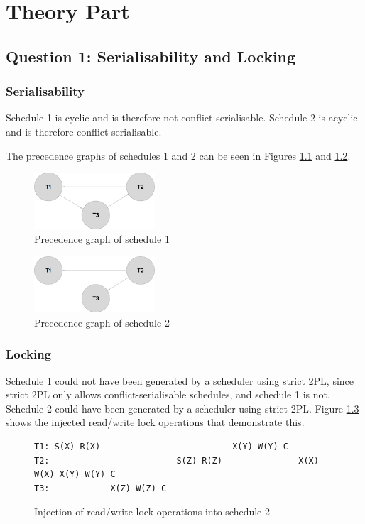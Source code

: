 \chapter{Theory Part}

\section{Question 1: Serialisability and Locking}

\subsection{Serialisability}
Schedule 1 is cyclic and is therefore not conflict-serialisable. Schedule 2 is acyclic and is therefore conflict-serialisable.

The precedence graphs of schedules 1 and 2 can be seen in Figures \ref{precedencegraph1} and \ref{precedencegraph2}.

\begin{figure}[H]
    \centering
    \includegraphics[width=0.4\textwidth]{schedule1.png}
    \caption{Precedence graph of schedule 1 \label{precedencegraph1}}
\end{figure}

\begin{figure}[H]
    \centering
    \includegraphics[width=0.4\textwidth]{schedule2.png}
    \caption{Precedence graph of schedule 2 \label{precedencegraph2}}
\end{figure}

\subsection{Locking}

Schedule 1 could not have been generated by a scheduler using strict 2PL, since strict 2PL only allows conflict-serialisable schedules, and schedule 1 is not.
Schedule 2 could have been generated by a scheduler using strict 2PL. Figure \ref{schedule2strict2pl} shows the injected read/write lock operations that demonstrate this.

\begin{figure}
\begin{verbatim}
T1: S(X) R(X)                          X(Y) W(Y) C
T2:                         S(Z) R(Z)               X(X) W(X) X(Y) W(Y) C
T3:            X(Z) W(Z) C
\end{verbatim}
\caption{Injection of read/write lock operations into schedule 2\label{schedule2strict2pl}}
\end{figure}
